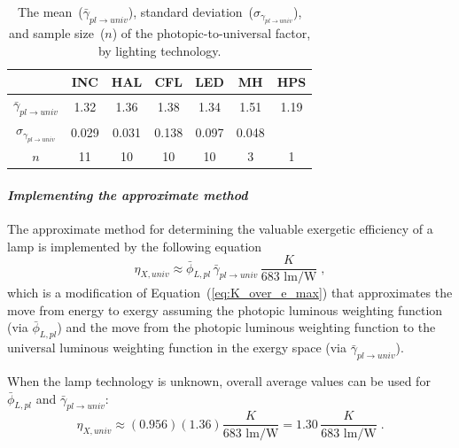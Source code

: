 \documentclass[energies,article,accept,moreauthors,pdftex]{Definitions/mdpi}\usepackage[]{graphicx}\usepackage[]{color}
\newcommand{\gammarat}{\gamma_{pl\rightarrow{}univ}}
\newcommand{\gammaratavg}{\bar{\gamma}_{pl\rightarrow{}univ}}
\providecommand{\DIFaddend}{} %
\providecommand{\DIFaddendFL}{} %
\providecommand{\DIFdelbeginFL}{} %
\newcommand{\DIFscaledelfig}{0.5}
\newlength{\DIFdelgraphicswidth} %
\newlength{\DIFdelgraphicsheight} %
\newcommand{\DIFdelincludegraphics}[2][]{%
\sbox{\DIFdelgraphicsbox}{\DIFOincludegraphics[#1]{#2}}%
\settoboxwidth{\DIFdelgraphicswidth}{\DIFdelgraphicsbox} %
\settoboxtotalheight{\DIFdelgraphicsheight}{\DIFdelgraphicsbox} %
\scalebox{\DIFscaledelfig}{%
\parbox[b]{\DIFdelgraphicswidth}{\usebox{\DIFdelgraphicsbox}\\[-\baselineskip] \rule{\DIFdelgraphicswidth}{0em}}\llap{\resizebox{\DIFdelgraphicswidth}{\DIFdelgraphicsheight}{%
\setlength{\unitlength}{\DIFdelgraphicswidth}%
\begin{picture}(1,1)%
\thicklines\linethickness{2pt} %
{\color[rgb]{1,0,0}\put(0,0){\framebox(1,1){}}}%
{\color[rgb]{1,0,0}\put(0,0){\line( 1,1){1}}}%
{\color[rgb]{1,0,0}\put(0,1){\line(1,-1){1}}}%
\end{picture}%
}\hspace*{3pt}}} %
} %
\DeclareRobustCommand{\DIFaddend}{\DIFOaddend \let\includegraphics\DIFOincludegraphics} %
\DeclareRobustCommand{\DIFaddendFL}{\DIFOaddendFL \let\includegraphics\DIFOincludegraphics} %
\DeclareRobustCommand{\DIFdelbeginFL}{\DIFOdelbeginFL \let\includegraphics\DIFdelincludegraphics} %
\begin{document}
\begin{table}[H]
\centering
\caption{The mean~($\bar{\gamma}_{pl\rightarrow{}univ}$),
                     standard deviation~($\sigma_{\gamma_{pl\rightarrow{}univ}}$), and 
                     sample size~($n$)
                     of the photopic-to-universal factor,
                     by lighting technology.} 
\label{tab:conversionfactors}
\begingroup\footnotesize
\begin{tabular}{ccccccc}
  \toprule
 & \textbf{INC} & \textbf{HAL} & \textbf{CFL} & \textbf{LED} & \textbf{MH} & \textbf{HPS} \\ 
  \midrule
\DIFaddendFL $\gammaratavg{}$ \DIFdelbeginFL & 1.32 & 1.36 & {1.38 }& 1.34 & 1.51 & 1.19 \\ 
  {$\sigma_{\gammarat}$ }&0.029 & {0.031 }& {0.138 }& {0.097 }& {0.048 }&  \\ 
  {$n$ }&{11 }& {10 }& {10 }& {10 }& {3 }& {1 }\\ 
   \bottomrule
\end{tabular}
\endgroup
\end{table}
\DIFaddend 



\paragraph{\emph{Implementing the approximate method}}

The approximate method for determining the valuable exergetic efficiency of a lamp
is implemented by the following equation
\begin{equation} \label{eq:approximate}
  \eta_{X,univ} \approx \bar{\phi}_{L,pl} \, \gammaratavg{} \, \frac{K}{683 \text{ lm/W}} \; ,
\end{equation}
%
which is a modification of Equation~(\ref{eq:K_over_e_max})
that approximates the move from energy to exergy
assuming the photopic luminous weighting function (via $\bar{\phi}_{L,pl}$)
and the move from the photopic luminous weighting function to the universal luminous weighting function
in the exergy space (via $\gammaratavg{}$).

When the lamp technology is unknown, overall average values can be used
for $\bar{\phi}_{L,pl}$ and $\gammaratavg{}$:
\begin{equation} \label{eq:approximate_unknown_tech}
  \eta_{X,univ} \approx (0.956) 
                        (1.36)
                        \frac{K}{683 \text{ lm/W}} 
                      = 1.30 \,
                        \frac{K}{683 \text{ lm/W}} \; .
\end{equation}
\end{document}
